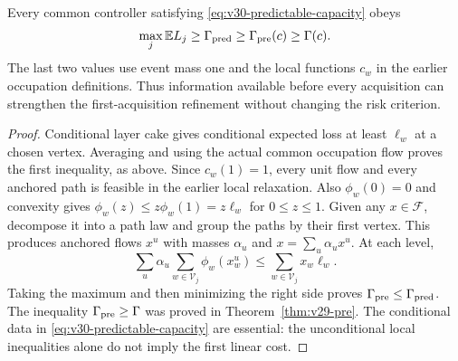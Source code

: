 \begin{proposition}
\label{prop:v30-predictable-bound}
Every common controller satisfying
\eqref{eq:v30-predictable-capacity} obeys
\begin{equation}\label{eq:v30-predictable-bound}
       \max_j\mathbb E L_j\ge\Gamma_{\rm pred}
                      \ge\Gamma_{\rm pre}(c)\ge\Gamma(c).
\end{equation}
The last two values use event mass one and the local functions $c_w$
in the earlier occupation definitions. Thus information available
before every acquisition can strengthen the first-acquisition
refinement without changing the risk criterion.
\end{proposition}
\begin{proof}
Conditional layer cake gives conditional expected loss at least
$\ell_w$ at a chosen vertex. Averaging and using the actual common
occupation flow proves the first inequality, as above. Since
$c_w(1)=1$, every unit flow and every anchored path is feasible in
the earlier local relaxation. Also $\phi_w(0)=0$ and convexity gives
$\phi_w(z)\le z\phi_w(1)=z\ell_w$ for $0\le z\le1$.
Given any $x\in\mathcal F$, decompose it into a path law and group
the paths by their first vertex. This produces anchored flows $x^u$
with masses $\alpha_u$ and $x=\sum_u\alpha_ux^u$. At each level,
\[
 \sum_u\alpha_u\sum_{w\in\mathscr V_j}\phi_w(x^u_w)
       \le\sum_{w\in\mathscr V_j}x_w\ell_w.
\]
Taking the maximum and then minimizing the right side proves
$\Gamma_{\rm pre}\le\Gamma_{\rm pred}$. The inequality
$\Gamma_{\rm pre}\ge\Gamma$ was proved in
Theorem~\ref{thm:v29-pre}. The conditional data in
\eqref{eq:v30-predictable-capacity} are essential: the unconditional
local inequalities alone do not imply the first linear cost.
\end{proof}

